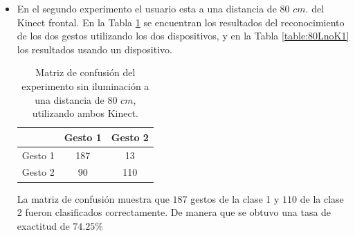 \begin{itemize}
La matriz de confusión muestra que $154$ gestos de la clase 1 y $133$ de la clase 2 fueron clasificados correctamente. De manera que se obtuvo una tasa de exactitud de $46.75 \%$ 


\item En el segundo experimento el usuario esta a una distancia de $80$ $cm.$ del Kinect frontal. En la Tabla \ref{table:80LnoK2} se encuentran los resultados del reconocimiento de los dos gestos utilizando los dos dispositivos, y en la Tabla \ref{table:80LnoK1} los resultados usando un dispositivo.   


\begin{table}[h!] 
\begin{center}
\begin{tabular}{ r || c | c |} 
 
        & Gesto 1 & Gesto 2 \\ \hline \hline  
Gesto 1 & 187     &  13     \\ \hline  
Gesto 2 & 90     &  110     \\   

\end{tabular}
\end{center} 
\caption{Matriz de confusión del experimento sin iluminación a una distancia de $80$ $cm$, utilizando ambos Kinect.}
\label{table:80LnoK2}
\end{table}  

La matriz de confusión muestra que $187$ gestos de la clase 1 y $110$ de la clase 2 fueron clasificados correctamente. De manera que se obtuvo una tasa de exactitud de $74.25 \%$ 

\begin{table}[h!] 
\begin{center}
\begin{tabular}{ r || c | c |} 
 

\end{tabular}
\end{center}
\end{table}
\end{itemize}
